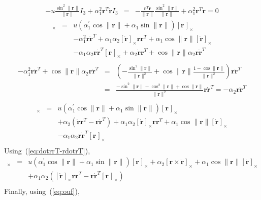 \documentclass {article}
\newcommand\rot{\mathbf{r}}
\newcommand\rcross[1]{[\rot_{#1}]_{\times}}
\newcommand\omegacross{[\omega]_{\times}}
\newcommand\rdotcross{\left[\dot{\rot}\right]_{\times}}
\newcommand\normr{\|\rot\|}
\newcommand\alphap{\alpha^{\prime}}
\begin{document}
\begin{eqnarray*}
-u \frac{\sin^2\normr}{\normr} I_3 + \alpha_1^2\rot^T\dot{\rot} I_3 &=&
-\frac{\rot^T\dot{\rot}}{\normr}\frac{\sin^2\normr}{\normr}+ \alpha_1^2\rot^T\dot{\rot} = 0
\end{eqnarray*}
\begin{eqnarray*}
\omegacross &=&
u\left(\alphap_1 \cos\normr + \alpha_1\sin\normr\right) \rcross{}\\
&& -\alpha_1^2\rot\dot{\rot}^T+ \alpha_1 \alpha_2 \rdotcross\rot\rot^T + \alpha_1\cos\normr\rdotcross\\
&&- \alpha_1 \alpha_2 \rot\dot{\rot}^T\rcross{} + \alpha_2\dot{\rot}\rot^T + \cos\normr\alpha_2\rot\dot{\rot}^T\\
\end{eqnarray*}
\begin{eqnarray*}
-\alpha_1^2\rot\dot{\rot}^T+ \cos\normr\alpha_2\rot\dot{\rot}^T &=&
\left(-\frac{\sin^2\normr}{\normr^2}+\cos\normr\frac{1-\cos\normr}{\normr^2}\right)\rot\dot{\rot}^T\\
&=&\frac{-\sin^2\normr-\cos^2\normr+\cos\normr}{\normr^2}\rot\dot{\rot}^T
=-\alpha_2\rot\dot{\rot}^T\\
\end{eqnarray*}
\begin{eqnarray*}
\omegacross &=&
u\left(\alphap_1 \cos\normr + \alpha_1\sin\normr\right) \rcross{}\\
&& + \alpha_2\left(\dot{\rot}\rot^T -\rot\dot{\rot}^T\right)+ \alpha_1 \alpha_2 \rdotcross\rot\rot^T + \alpha_1\cos\normr\rdotcross\\
&&- \alpha_1 \alpha_2 \rot\dot{\rot}^T\rcross{}\\
\end{eqnarray*}
Using~(\ref{eq:dotrrT-rdotrT}),
\begin{eqnarray*}
\omegacross &=&
u\left(\alphap_1 \cos\normr + \alpha_1\sin\normr\right) \rcross{} + \alpha_2\left[\rot\times\dot{\rot}\right]_{\times} + \alpha_1\cos\normr\rdotcross\\
&& + \alpha_1 \alpha_2 \left(\rdotcross\rot\rot^T - \rot\dot{\rot}^T\rcross{}\right)\\
\end{eqnarray*}
Finally, using~(\ref{eq:ouf}),
\end{document}
